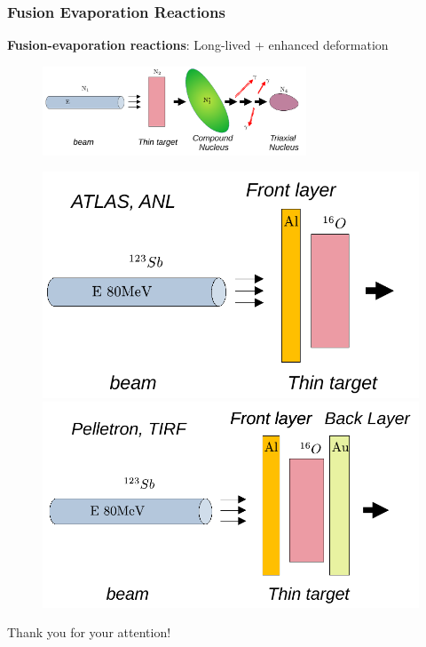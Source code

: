 \documentclass{beamer}
\begin{document}
\begin{frame}
	\frametitle{Fusion Evaporation Reactions}
	\textbf{Fusion-evaporation reactions}: {\color{red}Long-lived} + {\color{red}enhanced deformation}
	\begin{figure}
        \centering
        \includegraphics[width=0.7\textwidth]{figures/fusion-evaporation.pdf}
    \end{figure}
	\begin{figure}
		\centering
		\includegraphics[scale=0.4]{figures/beam-sandwich.pdf}
		\includegraphics[scale=0.4]{figures/beam-sandwich-2.pdf}
	\end{figure}
\end{frame}


\begin{frame}
	\begin{center}
		\bigskip\bigskip
		{\Huge Thank you for your attention!}
	\end{center}
\end{frame} 
\end{document}
